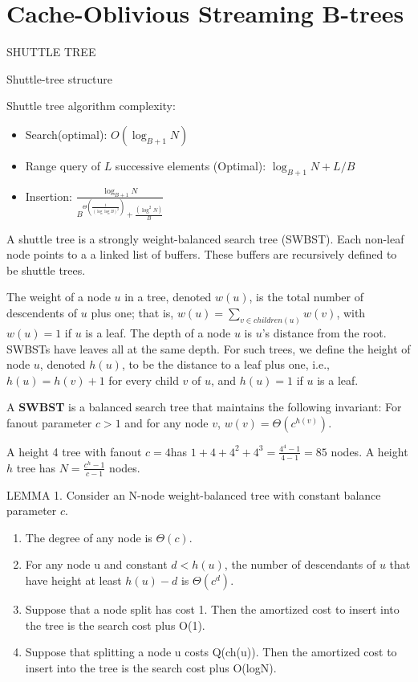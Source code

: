 \documentclass{book}
\begin{document}
\chapter{Cache-Oblivious Streaming B-trees}

SHUTTLE TREE

Shuttle-tree structure

Shuttle tree algorithm complexity:
\begin{itemize}
  \item Search(optimal): $O(\log_{B+1}N)$
  \item Range query of $L$ successive elements (Optimal): $\log_{B+1}N + L/B$
  \item Insertion: $\frac{\log_{B+1}N}{B^{\Theta(\frac{1}{(\log\log B)^2})}+\frac{(\log^2 N)}{B}}$
\end{itemize}

A shuttle tree is a strongly weight-balanced search tree (SWBST). Each non-leaf node points to a a linked list of buffers. These buffers are recursively defined to be shuttle trees.

The weight of a node $u$ in  a tree, denoted $w(u)$, is the total number of descendents of $u$ plus one; that is, $w(u)=\sum_{v\in children(u)}w(v)$, with $w(u)=1$ if $u$ is a leaf. The depth of a node $u$ is $u$’s distance from the root. SWBSTs have leaves all at the same depth. For such trees, we define the height of node $u$, denoted $h(u)$, to be the distance to a leaf plus one, i.e., $h(u) = h(v)+1$ for every child $v$ of $u$, and $h(u) = 1$ if $u$ is a leaf.

A \textbf{SWBST} is a balanced search tree that maintains the following invariant: For fanout parameter $c > 1$ and for any node $v$, $w(v) = \Theta(c^{h(v)})$.

A height 4 tree with fanout $c=4$has $1 + 4 + 4^2 + 4^3=\frac{4^4-1}{4-1}=85$ nodes. A height $h$ tree has $N=\frac{c^h-1}{c-1}$ nodes.

LEMMA 1. Consider an N-node weight-balanced tree with constant balance parameter $c$.
\begin{enumerate}
  \item The degree of any node is $\Theta(c)$.
  \item For any node u and constant $d<h(u)$, the number of descendants
of $u$ that have height at least $h(u)-d$ is $\Theta(c^d)$.
\item Suppose that a node split has cost 1. Then the amortized cost to
insert into the tree is the search cost plus O(1).
\item Suppose that splitting a node u costs Q(ch(u)). Then the amortized
cost to insert into the tree is the search cost plus O(logN).
\end{enumerate}
\end{document}
